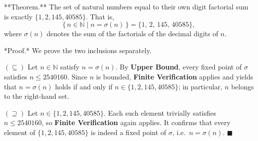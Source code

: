 **Theorem.** The set of natural numbers equal to their own digit factorial sum is exactly $\{1, 2, 145, 40585\}$. That is,
$$\{\, n \in \mathbb{N} \mid n = \sigma(n) \,\} = \{1,\, 2,\, 145,\, 40585\},$$
where $\sigma(n)$ denotes the sum of the factorials of the decimal digits of $n$.

*Proof.* We prove the two inclusions separately.

$(\subseteq)$ Let $n \in \mathbb{N}$ satisfy $n = \sigma(n)$. By \textbf{Upper Bound}, every fixed point of $\sigma$ satisfies $n \leq 2540160$. Since $n$ is bounded, \textbf{Finite Verification} applies and yields that $n = \sigma(n)$ holds if and only if $n \in \{1, 2, 145, 40585\}$; in particular, $n$ belongs to the right-hand set.

$(\supseteq)$ Let $n \in \{1, 2, 145, 40585\}$. Each such element trivially satisfies $n \leq 2540160$, so \textbf{Finite Verification} again applies. It confirms that every element of $\{1, 2, 145, 40585\}$ is indeed a fixed point of $\sigma$, i.e.\ $n = \sigma(n)$. $\blacksquare$